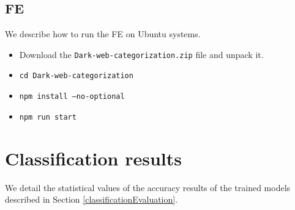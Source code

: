 \begin{appendices}
\section{FE}
We describe how to run the FE on Ubuntu systems.
\begin{itemize}
    \item Download the \texttt{Dark-web-categorization.zip} file and unpack it.
    \item \texttt{cd Dark-web-categorization}
    \item \texttt{npm install --no-optional}
    \item \texttt{npm run start}
\end{itemize}


\chapter{Classification results}
We detail the statistical values of the accuracy results of the trained models described in Section \ref{classificationEvaluation}.


\end{appendices}
